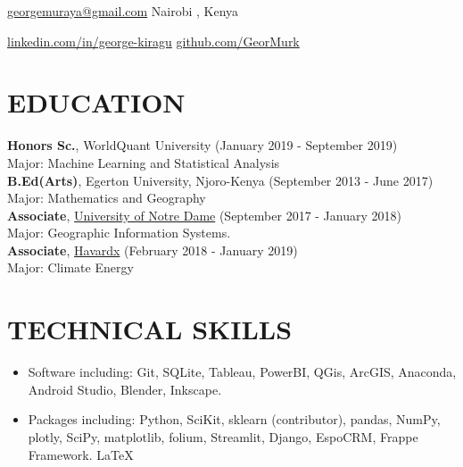 \documentclass[line,margin,10pt]{res}
\begin{document}
 
\begin{resume}
\hoffset\centerline 
{\href{mailto:georgemuraya@gmail.com}{georgemuraya@gmail.com} \quad \quad \quad \quad \quad \quad \quad \quad \quad \quad \quad\quad \quad \quad \quad \quad \quad \quad \quad \quad \quad \quad  \quad     Nairobi , Kenya}
\hoffset\centerline 
{\hspace{0.05cm} \href{https://linkedin.com/in/george-kiragu}{linkedin.com/in/george-kiragu} \quad \quad \quad \quad \quad \quad \quad \quad \quad \quad \quad\quad \quad \quad \quad \quad \quad \quad \quad \quad \quad \quad  \quad \quad \quad  \quad \quad \quad   \quad \href{https://github.com/GeorMurk}{github.com/GeorMurk}}
 
{\vspace{-0.25cm}}

\section{EDUCATION} 
\textbf{Honors Sc.}, WorldQuant University \hfill (January 2019 - September 2019)\\
Major: Machine Learning and Statistical Analysis \\
\textbf{B.Ed(Arts)}, Egerton University, Njoro-Kenya \hfill (September 2013 - June 2017)\\
Major: Mathematics and Geography \\ 
\textbf{Associate}, \href{https://edge.edx.org/courses/course-v1:NotreDame+GIS000+0000/courseware}{University of Notre Dame} \hfill (September 2017 - January 2018)\\
Major: Geographic Information Systems. \\
\textbf{Associate}, \href{https://courses.edx.org/courses/course-v1:HarvardX+SPU29x+3T2016/course/}{Havardx} \hfill (February 2018 - January 2019)\\
Major: Climate Energy \\

\section{TECHNICAL SKILLS} 
\begin{itemize}[leftmargin=-2pt] \itemsep -2pt
\item [] Software including: Git, SQLite, Tableau, PowerBI, QGis, ArcGIS, Anaconda, Android Studio, Blender, Inkscape.
\item []Packages including:  Python, SciKit, sklearn (contributor), pandas, NumPy, plotly, SciPy, matplotlib, folium, Streamlit, Django, EspoCRM, Frappe Framework. \LaTeX\
\end{itemize}
{\vspace{-0.25cm}}



\end{resume}
\end{document}
